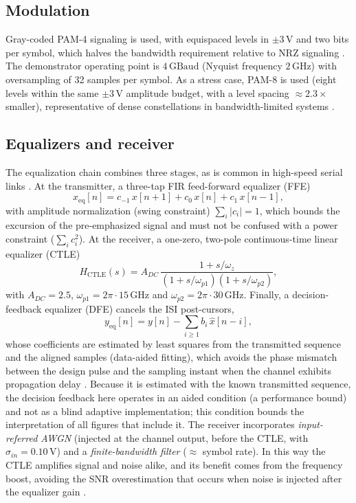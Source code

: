 \documentclass[preprint,review,12pt]{elsarticle}
\begin{document}
\subsection{Modulation}
Gray-coded PAM-4 signaling is used, with equispaced levels in
$\pm 3\,\mathrm{V}$ and two bits per symbol, which halves the bandwidth
requirement relative to NRZ signaling \citep{7964959}. The demonstrator
operating point is $4\,\mathrm{GBaud}$ (Nyquist frequency $2\,\mathrm{GHz}$)
with oversampling of 32 samples per symbol. As a stress case, PAM-8 is
used (eight levels within the same $\pm 3\,\mathrm{V}$ amplitude budget,
with a level spacing $\approx 2.3\times$ smaller), representative of dense
constellations in bandwidth-limited systems \citep{8963973}.

\subsection{Equalizers and receiver}
The equalization chain combines three stages, as is common in high-speed
serial links \citep{10260232,10811094}. At the transmitter, a three-tap FIR
feed-forward equalizer (FFE)
\begin{equation}
x_{\mathrm{eq}}[n] = c_{-1}\,x[n{+}1] + c_{0}\,x[n] + c_{1}\,x[n{-}1],
\label{eq:ffe}
\end{equation}
with amplitude normalization (swing constraint) $\sum_i |c_i|=1$, which
bounds the excursion of the pre-emphasized signal and must not be confused
with a power constraint ($\sum_i c_i^2$). At the receiver, a one-zero,
two-pole continuous-time linear equalizer (CTLE) \citep{10873709}
\begin{equation}
H_{\mathrm{CTLE}}(s) = A_{DC}\,\frac{1+s/\omega_z}{(1+s/\omega_{p1})(1+s/\omega_{p2})},
\label{eq:ctle}
\end{equation}
with $A_{DC}=2.5$, $\omega_{p1}=2\pi\!\cdot\!15\,\mathrm{GHz}$ and
$\omega_{p2}=2\pi\!\cdot\!30\,\mathrm{GHz}$. Finally, a decision-feedback
equalizer (DFE) cancels the ISI post-cursors,
\begin{equation}
y_{\mathrm{eq}}[n] = y[n] - \sum_{i\ge 1} b_i\,\hat{x}[n{-}i],
\label{eq:dfe}
\end{equation}
whose coefficients are estimated by least squares from the transmitted
sequence and the aligned samples (data-aided fitting), which avoids the
phase mismatch between the design pulse and the sampling instant when the
channel exhibits propagation delay \citep{11346689}. Because it is
estimated with the known transmitted sequence, the decision feedback here
operates in an aided condition (a performance bound) and not as a blind
adaptive implementation; this condition bounds the interpretation of all
figures that include it. The receiver incorporates
\emph{input-referred AWGN} (injected at the channel output, before the
CTLE, with $\sigma_{in}=0.10\,\mathrm{V}$) and a \emph{finite-bandwidth
filter} ($\approx$ symbol rate). In this way the CTLE amplifies signal and
noise alike, and its benefit comes from the frequency boost, avoiding the
SNR overestimation that occurs when noise is injected after the equalizer
gain \citep{9707817}.
\end{document}
